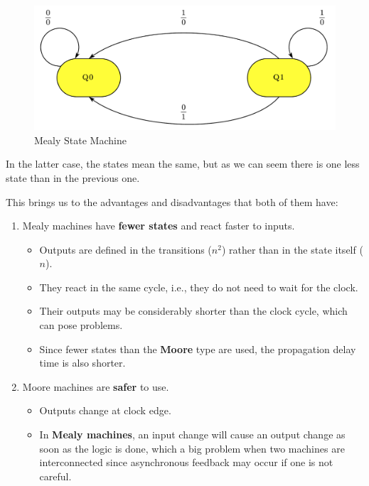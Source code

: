 \begin{figure}[H]
    \centering
    \includegraphics[scale = 0.45]{Graphics/Practice 4/MEALY_FSM.pdf}
    \caption{Mealy State Machine ~\autocite{SLIDES_4}}
    \label{fig:MEALY}
\end{figure}

In the latter case, the states mean the same, but as we can seem there is one less state than in the previous one. \medskip

\clearpage

This brings us to the advantages and disadvantages that both of them have:

\begin{enumerate}
    \item Mealy machines have \textbf{fewer states} and react faster to inputs.
        \begin{itemize}
            \item Outputs are defined in the transitions ($n^2$) rather than in the state itself ($n$).
            \item They react in the same cycle, i.e., they do not need to wait for the clock.
            \item Their outputs may be considerably shorter than the clock cycle, which can pose problems.
            \item Since fewer states than the \textbf{Moore} type are used, the propagation delay time is also shorter.
        \end{itemize}
    \item Moore machines are \textbf{safer} to use.
        \begin{itemize}
            \item Outputs change at clock edge.
            \item In \textbf{Mealy machines}, an input change will cause an output change as soon as the logic is done, which a big problem when two machines are interconnected since asynchronous feedback may occur if one is not careful.
        \end{itemize}
\end{enumerate}


